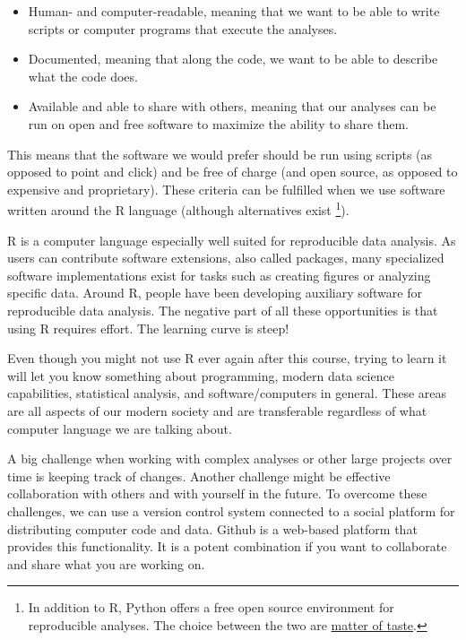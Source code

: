 \documentclass[
  11pt,
  letterpaper,
]{scrbook}
\providecommand{\tightlist}{%
  \setlength{\itemsep}{0pt}\setlength{\parskip}{0pt}}\usepackage{longtable,booktabs,array}
\begin{document}
\begin{itemize}
\tightlist
\item
  Human- and computer-readable, meaning that we want to be able to write
  scripts or computer programs that execute the analyses.
\item
  Documented, meaning that along the code, we want to be able to
  describe what the code does.
\item
  Available and able to share with others, meaning that our analyses can
  be run on open and free software to maximize the ability to share
  them.
\end{itemize}

This means that the software we would prefer should be run using scripts
(as opposed to point and click) and be free of charge (and open source,
as opposed to expensive and proprietary). These criteria can be
fulfilled when we use software written around the R language (although
alternatives exist \footnote{In addition to R, Python offers a free open
  source environment for reproducible analyses. The choice between the
  two are
  \href{https://www.datacamp.com/community/tutorials/r-or-python-for-data-analysis}{matter
  of taste}.}).

R is a computer language especially well suited for reproducible data
analysis. As users can contribute software extensions, also called
packages, many specialized software implementations exist for tasks such
as creating figures or analyzing specific data. Around R, people have
been developing auxiliary software for reproducible data analysis. The
negative part of all these opportunities is that using R requires
effort. The learning curve is steep!

Even though you might not use R ever again after this course, trying to
learn it will let you know something about programming, modern data
science capabilities, statistical analysis, and software/computers in
general. These areas are all aspects of our modern society and are
transferable regardless of what computer language we are talking about.

A big challenge when working with complex analyses or other large
projects over time is keeping track of changes. Another challenge might
be effective collaboration with others and with yourself in the future.
To overcome these challenges, we can use a version control system
connected to a social platform for distributing computer code and data.
Github is a web-based platform that provides this functionality. It is a
potent combination if you want to collaborate and share what you are
working on.
\end{document}

